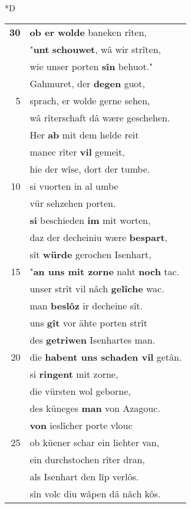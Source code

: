 \documentclass[8pt,a4paper,notitlepage]{article}
\begin{document}
\begin{table}[ht]
\begin{minipage}[t]{0.5\linewidth}
\small
\begin{center}*D
\end{center}
\begin{tabular}{rl}
\textbf{30} & \textbf{ob er wolde} baneken rîten,\\ 
 & "\textbf{unt} \textbf{schouwet}, wâ wir strîten,\\ 
 & wie unser porten \textbf{sîn} behuot."\\ 
 & Gahmuret, der \textbf{degen} guot,\\ 
5 & sprach, er wolde gerne sehen,\\ 
 & wâ rîterschaft dâ wære geschehen.\\ 
 & Her \textbf{ab} mit dem helde reit\\ 
 & manec rîter \textbf{vil} gemeit,\\ 
 & hie der wîse, dort der tumbe.\\ 
10 & si vuorten in al umbe\\ 
 & vür sehzehen porten.\\ 
 & \textbf{si} beschieden \textbf{im} mit worten,\\ 
 & daz der decheiniu wære \textbf{bespart},\\ 
 & sît \textbf{würde} gerochen Isenhart,\\ 
15 & "\textbf{an uns mit zorne} naht \textbf{noch} tac.\\ 
 & unser strît vil nâch \textbf{gelîche} wac.\\ 
 & man \textbf{beslôz} ir decheine sît.\\ 
 & uns \textbf{gît} vor ähte porten strît\\ 
 & des \textbf{getriwen} Isenhartes man.\\ 
20 & die \textbf{habent uns schaden vil} getân.\\ 
 & si \textbf{ringent} mit zorne,\\ 
 & die vürsten wol geborne,\\ 
 & des küneges \textbf{man} von Azagouc.\\ 
 & \textbf{von} ieslîcher porte vlouc\\ 
25 & ob küener schar ein liehter van,\\ 
 & ein durchstochen rîter dran,\\ 
 & als Isenhart den lîp verlôs.\\ 
 & sîn volc diu wâpen dâ nâch kôs.\\ 

\end{tabular}
\end{minipage}
\end{table}
\end{document}
